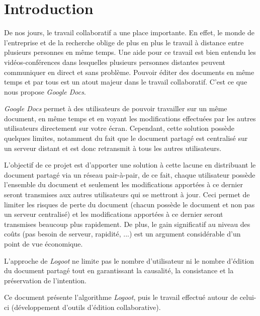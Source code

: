\chapter*{Introduction}

De nos jours, le travail collaboratif a une place importante. En effet, le monde
de l'entreprise et de la recherche oblige de plus en plus le travail à distance
entre plusieurs personnes en même temps. Une aide pour ce travail est bien
entendu les vidéos-conférences dans lesquelles plusieurs personnes distantes
peuvent communiquer en direct et sans problème. Pouvoir éditer des documents en
même temps et par tous est un atout majeur dans le travail collaboratif. C'est
ce que nous propose \emph{Google Docs}.

\emph{Google Docs} permet à des utilisateurs de pouvoir travailler sur un même
document, en même temps et en voyant les modifications effectuées par les autres
utilisateurs directement sur votre écran. Cependant, cette solution possède
quelques limites, notamment du fait que le document partagé est centralisé sur
un serveur distant et est donc retransmit à tous les autres utilisateurs.

L'objectif de ce projet est d'apporter une solution à cette lacune en
distribuant le document partagé via un réseau pair-à-pair, de ce fait, chaque
utilisateur possède l'ensemble du document et seulement les modifications
apportées à ce dernier seront transmises aux autres utilisateurs qui se mettront
à jour. Ceci permet de limiter les risques de perte du document (chacun possède
le document et non pas un serveur centralisé) et les modifications apportées à
ce dernier seront transmises beaucoup plus rapidement. De plus, le gain
significatif au niveau des coûts (pas besoin de serveur, rapidité, ...) est un
argument considérable d'un point de vue économique.

L'approche de \emph{Logoot} ne limite pas le nombre d'utilisateur ni le nombre
d'édition du document partagé tout en garantissant la causalité, la consistance
et la préservation de l'intention.

Ce document présente l'algorithme \emph{Logoot}, puis le travail effectué autour
de celui-ci (développement d'outils d'édition collaborative).

